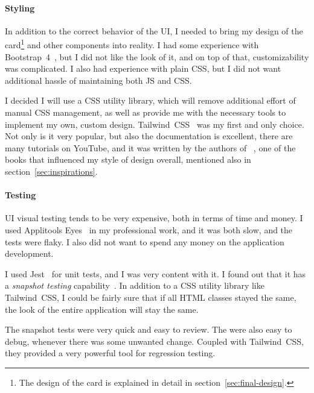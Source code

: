 \paragraph*{Styling}\label{sec:ui-styling}

In addition to the correct behavior of the \ac{UI},
I needed to bring my design of the card\footnote{
  The design of the card
  is explained in detail
  in section~\ref{sec:final-design}.
} and other components
into reality.
I had some experience with Bootstrap~4~\cite{otto_bootstrap_2018},
but I did not like the look of it,
and on top of that,
customizability was complicated.
I also had experience with plain \ac{CSS},
but I did not want additional hassle
of maintaining both \ac{JS} and \ac{CSS}.

I decided I will use a \ac{CSS} utility library,
which will remove additional effort
of manual \ac{CSS} management,
as well as provide me with the necessary tools
to implement my own, custom design.
Tailwind~CSS~\cite{wathan_tailwind_2022}
was my first and only choice.
Not only is it very popular,
but also the documentation is excellent,
there are many tutorials on YouTube,
and it was written by the authors
of ~\cite{wathan_refactoring_2018},
one of the books that influenced
my style of design overall,
mentioned also in section~\ref{sec:inspirations}.

\paragraph*{Testing}\label{sec:ui-testing}

\Ac{UI} visual testing tends to be very expensive,
both in terms of time and money.
I used Applitools Eyes~\cite{applitools_applitools_2022}
in my professional work,
and it was both slow,
and the tests were flaky.
I also did not want to spend any money
on the application development.

I used Jest~\cite{bekkhus_jest_2022} for unit tests,
and I was very content with it.
I found out that it has
a \textit{snapshot testing} capability~\cite{bekkhus_snapshot_2022}.
In addition to a \ac{CSS} utility library
like Tailwind~CSS,
I could be fairly sure
that if all \ac{HTML} classes stayed the same,
the look of the entire application
will stay the same.

The snapshot tests were very quick
and easy to review.
The were also easy to debug,
whenever there was some unwanted change.
Coupled with Tailwind~CSS,
they provided a very powerful tool
for regression testing.

